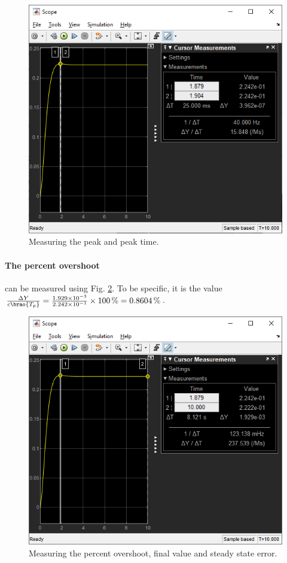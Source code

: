 \documentclass[12pt]{article}
\DeclarePairedDelimiter\brao()%
\begin{document}
\begin{figure}[h]
    \centering
    \includegraphics[width=\linewidth]{part01a_measuring_peak.png}
    \caption{Measuring the peak and peak time.}
    \label{fig:step - measuring peak}
\end{figure}

\paragraph{The percent overshoot} can be measured using Fig. \ref{fig:step - measuring percent overshoot}.
To be specific, it is the value $\frac{\Delta Y}{c\brao{T_p}} = \frac{\num{1.929e-03}}{\num{2.242e-1}}\times\SI{100}\percent = \SI{0.8604}\percent$.

\begin{figure}[h]
    \centering
    \includegraphics[width=\linewidth]{part01a_measuring_pcOS.png}
    \caption{Measuring the percent overshoot, final value and steady state error.}
    \label{fig:step - measuring percent overshoot}
\end{figure}
\end{document}
